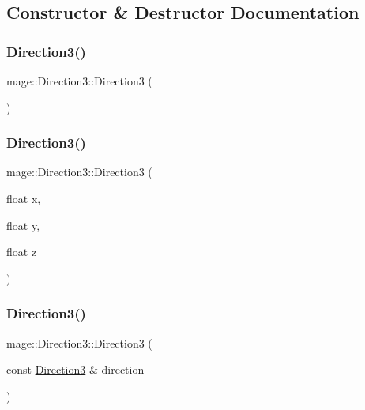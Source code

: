 \subsection{Constructor \& Destructor Documentation}
\hypertarget{structmage_1_1_direction3_a29603b6349c5a313d5bd93e0b0235ff1}{}\label{structmage_1_1_direction3_a29603b6349c5a313d5bd93e0b0235ff1} 
\subsubsection{\texorpdfstring{Direction3()}{Direction3()}\hspace{0.1cm}{\footnotesize\ttfamily [1/10]}}
{\footnotesize\ttfamily mage\+::\+Direction3\+::\+Direction3 (\begin{DoxyParamCaption}{ }\end{DoxyParamCaption})}

\hypertarget{structmage_1_1_direction3_a1b2cd4ce14856da23dfa9c5facc90da2}{}\label{structmage_1_1_direction3_a1b2cd4ce14856da23dfa9c5facc90da2} 
\subsubsection{\texorpdfstring{Direction3()}{Direction3()}\hspace{0.1cm}{\footnotesize\ttfamily [2/10]}}
{\footnotesize\ttfamily mage\+::\+Direction3\+::\+Direction3 (\begin{DoxyParamCaption}\item[{float}]{x,  }\item[{float}]{y,  }\item[{float}]{z }\end{DoxyParamCaption})}

\hypertarget{structmage_1_1_direction3_a8f6264f5a7a7590e67f4efa8f0687cdd}{}\label{structmage_1_1_direction3_a8f6264f5a7a7590e67f4efa8f0687cdd} 
\subsubsection{\texorpdfstring{Direction3()}{Direction3()}\hspace{0.1cm}{\footnotesize\ttfamily [3/10]}}
{\footnotesize\ttfamily mage\+::\+Direction3\+::\+Direction3 (\begin{DoxyParamCaption}\item[{const \hyperlink{structmage_1_1_direction3}{Direction3} \&}]{direction }\end{DoxyParamCaption})}

